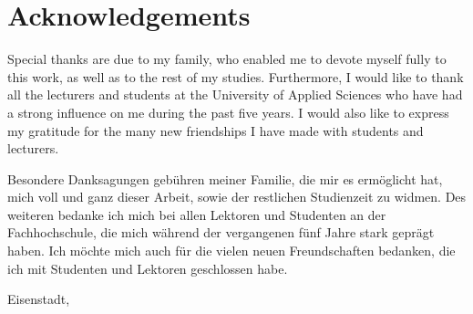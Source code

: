 \thispagestyle{empty}
\chapter{Acknowledgements}


Special thanks are due to my family, who enabled me to devote myself fully to this work, as well as to the rest of my studies.
Furthermore, I would like to thank all the lecturers and students at the University of Applied Sciences who have had a strong influence on me during the past five years.
I would also like to express my gratitude for the many new friendships I have made with students and lecturers.


Besondere Danksagungen gebühren meiner Familie, die mir es ermöglicht hat, mich voll und ganz dieser Arbeit, sowie der restlichen Studienzeit zu widmen.
Des weiteren bedanke ich mich bei allen Lektoren und Studenten an der Fachhochschule, die mich während der vergangenen fünf Jahre stark geprägt haben.
Ich möchte mich auch für die vielen neuen Freundschaften bedanken, die ich mit Studenten und Lektoren geschlossen habe.




\vspace{2cm} 


\begin{flushleft}
    \yourNameInclTitle 
\end{flushleft}
Eisenstadt, \thesisDate 

\clearpage
